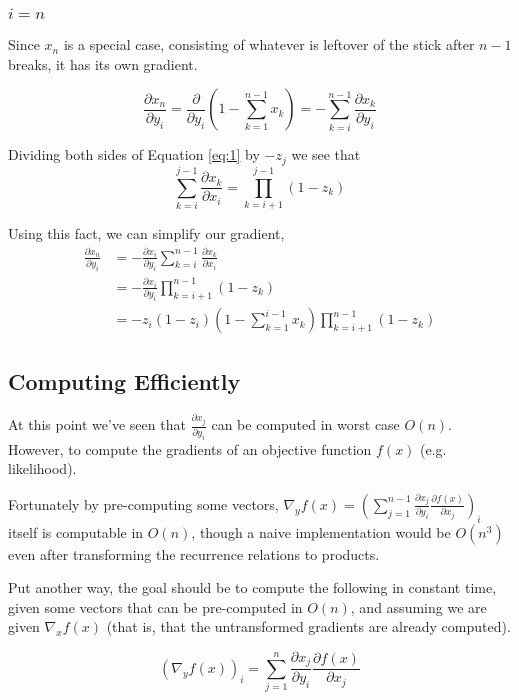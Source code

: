 \documentclass{article}
\begin{document}
\subsubsection{$i = n$}

Since $x_n$ is a special case, consisting of whatever is leftover of the stick
after $n-1$ breaks, it has its own gradient.

$$\frac{\partial x_n}{\partial y_i}
= \frac{\partial}{\partial y_i} \left( 1 - \sum_{k=1}^{n-1} x_k \right)
= - \sum_{k=i}^{n-1} \frac{\partial x_k}{\partial y_i}
$$

Dividing both sides of Equation \ref{eq:1} by $-z_j$ we see that
$$\sum_{k=i}^{j-1} \frac{\partial x_k}{\partial x_i} = \prod_{k=i+1}^{j-1} (1 - z_k)$$

Using this fact, we can simplify our gradient,
\begin{align}
\frac{\partial x_n}{\partial y_i}
&= - \frac{\partial x_i}{\partial y_i} \sum_{k=i}^{n-1} \frac{\partial
x_k}{\partial x_i} \\
&= - \frac{\partial x_i}{\partial y_i} \prod_{k=i+1}^{n-1} (1 - z_k) \\
&= - z_i (1 - z_i) \left( 1 - \sum_{k=1}^{i-1} x_k \right) \prod_{k=i+1}^{n-1} (1 - z_k)
\end{align}


\subsection{Computing Efficiently}

At this point we've seen that $\frac{\partial x_j}{\partial y_i}$ can be
computed in worst case $O(n)$. However, to compute the gradients of an objective
function $f(x)$ (e.g. likelihood).

Fortunately by pre-computing some vectors, $\nabla_y f(x) = \left( \sum_{j=1}^{n-1}
\frac{\partial x_j}{\partial y_i} \frac{\partial f(x)}{\partial x_j} \right)_i$
itself is computable in $O(n)$, though a naive implementation would be $O(n^3)$
even after transforming the recurrence relations to products.

Put another way, the goal should be to compute the following in constant time,
given some vectors that can be pre-computed in $O(n)$, and assuming we are given
$\nabla_x f(x)$ (that is, that the untransformed gradients are already
computed).

$$\left( \nabla_y f(x) \right)_i = \sum_{j=1}^{n} \frac{\partial x_j}{\partial
y_i} \frac{\partial f(x)}{\partial x_j}$$
\end{document}
